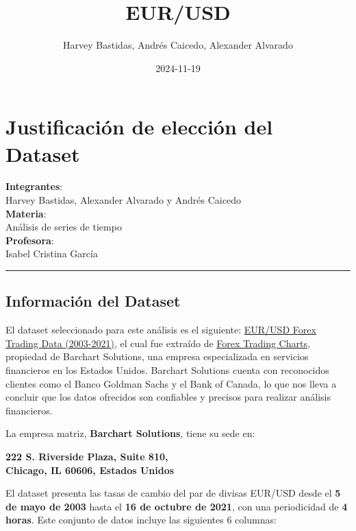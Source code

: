 \documentclass[
]{book}
\title{EUR/USD}
\author{Harvey Bastidas, Andrés Caicedo, Alexander Alvarado}
\date{2024-11-19}
\begin{document}
\maketitle

{
\setcounter{tocdepth}{1}
\tableofcontents
}
\chapter{Justificación de elección del Dataset}\label{justificaciuxf3n-de-elecciuxf3n-del-dataset}

\textbf{Integrantes}:\\
Harvey Bastidas, Alexander Alvarado y Andrés Caicedo\\
\textbf{Materia}:\\
Análisis de series de tiempo\\
\textbf{Profesora}:\\
Isabel Cristina García

\begin{center}\rule{0.5\linewidth}{0.5pt}\end{center}

\section{Información del Dataset}\label{informaciuxf3n-del-dataset}

El dataset seleccionado para este análisis es el siguiente: \href{https://www.kaggle.com/datasets/chandrimad31/eurusd-forex-trading-data-20032021}{EUR/USD Forex Trading Data (2003-2021)}, el cual fue extraído de \href{https://forex.tradingcharts.com/}{Forex Trading Charts}, propiedad de Barchart Solutions, una empresa especializada en servicios financieros en los Estados Unidos. Barchart Solutions cuenta con reconocidos clientes como el Banco Goldman Sachs y el Bank of Canada, lo que nos lleva a concluir que los datos ofrecidos son confiables y precisos para realizar análisis financieros.

La empresa matriz, \textbf{Barchart Solutions}, tiene su sede en:

\textbf{222 S. Riverside Plaza, Suite 810,\\
Chicago, IL 60606, Estados Unidos}

El dataset presenta las tasas de cambio del par de divisas EUR/USD desde el \textbf{5 de mayo de 2003} hasta el \textbf{16 de octubre de 2021}, con una periodicidad de \textbf{4 horas}. Este conjunto de datos incluye las siguientes 6 columnas:
\end{document}
